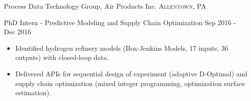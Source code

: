 \documentclass[10pt,a4paper]{article}
\begin{document}
  \headedsection
{Process Data Technology Group, Air Products Inc.}
{\textsc{Allentown, PA}}
{
  \headedsubsection
  {PhD Intern - Predictive Modeling and Supply Chain Optimization}
  {Sep 2016 - Dec 2016}
  {
    \begin{itemize}
    \item Identified hydrogen refinery models (Box-Jenkins Models, 17 inputs, 36 outputs) with closed-loop data.
      
      
    \item Delivered APIs for sequential design of experiment (adaptive D-Optimal) and supply chain optimization (mixed integer programming, optimization surface estimation).
      
      
    \end{itemize}
  }
}
\end{document}
